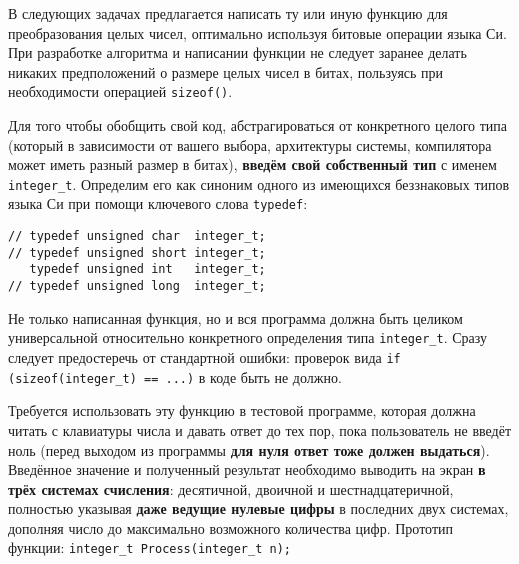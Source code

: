 
В следующих задачах предлагается написать ту или иную функцию для
преобразования целых чисел, оптимально используя битовые операции языка Си.
При разработке алгоритма и написании функции не следует заранее делать никаких
предположений о размере целых чисел в битах, пользуясь при необходимости
операцией \texttt{sizeof()}.

Для того чтобы обобщить свой код, абстрагироваться от конкретного целого типа
(который в зависимости от вашего выбора, архитектуры системы, компилятора
может иметь разный размер в битах), \textbf{введём свой собственный тип} с
именем \texttt{integer\_t}. Определим его как синоним одного из имеющихся
беззнаковых типов языка Си при помощи ключевого слова \texttt{typedef}:

\medskip
\begin{verbatim}
// typedef unsigned char  integer_t;
// typedef unsigned short integer_t;
   typedef unsigned int   integer_t;
// typedef unsigned long  integer_t;
\end{verbatim}
\medskip

Не только написанная функция, но и вся программа должна быть целиком
универсальной относительно конкретного определения типа \texttt{integer\_t}.
Сразу следует предостеречь от стандартной ошибки: проверок вида
\texttt{if (sizeof(integer\_t) == ...)} в коде быть не должно.

Требуется использовать эту функцию в тестовой программе, которая должна читать
с клавиатуры числа и давать ответ до тех пор, пока пользователь не введёт ноль
(перед выходом из программы \textbf{для нуля ответ тоже должен выдаться}).
Введённое значение и полученный результат необходимо выводить на экран
\textbf{в трёх системах счисления}: десятичной, двоичной и шестнадцатеричной,
полностью указывая \textbf{даже ведущие нулевые цифры} в последних двух
системах, дополняя число до максимально возможного количества цифр.
Прототип функции: \texttt{integer\_t Process(integer\_t n);}


\zzsectionCOMMENTS

